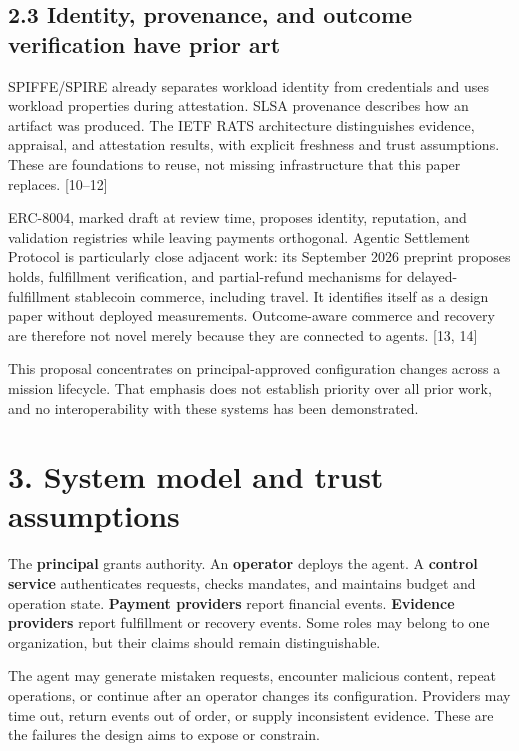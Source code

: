\documentclass[
  11pt,
  letterpaper,
]{article}
\begin{document}
\subsection{2.3 Identity, provenance, and outcome verification have
prior
art}\label{identity-provenance-and-outcome-verification-have-prior-art}

SPIFFE/SPIRE already separates workload identity from credentials and
uses workload properties during attestation. SLSA provenance describes
how an artifact was produced. The IETF RATS architecture distinguishes
evidence, appraisal, and attestation results, with explicit freshness
and trust assumptions. These are foundations to reuse, not missing
infrastructure that this paper replaces. {[}10--12{]}

ERC-8004, marked draft at review time, proposes identity, reputation,
and validation registries while leaving payments orthogonal. Agentic
Settlement Protocol is particularly close adjacent work: its September
2026 preprint proposes holds, fulfillment verification, and
partial-refund mechanisms for delayed-fulfillment stablecoin commerce,
including travel. It identifies itself as a design paper without
deployed measurements. Outcome-aware commerce and recovery are therefore
not novel merely because they are connected to agents. {[}13, 14{]}

This proposal concentrates on principal-approved configuration changes
across a mission lifecycle. That emphasis does not establish priority
over all prior work, and no interoperability with these systems has been
demonstrated.

\section{3. System model and trust
assumptions}\label{system-model-and-trust-assumptions}

The \textbf{principal} grants authority. An \textbf{operator} deploys
the agent. A \textbf{control service} authenticates requests, checks
mandates, and maintains budget and operation state. \textbf{Payment
providers} report financial events. \textbf{Evidence providers} report
fulfillment or recovery events. Some roles may belong to one
organization, but their claims should remain distinguishable.

The agent may generate mistaken requests, encounter malicious content,
repeat operations, or continue after an operator changes its
configuration. Providers may time out, return events out of order, or
supply inconsistent evidence. These are the failures the design aims to
expose or constrain.
\end{document}
